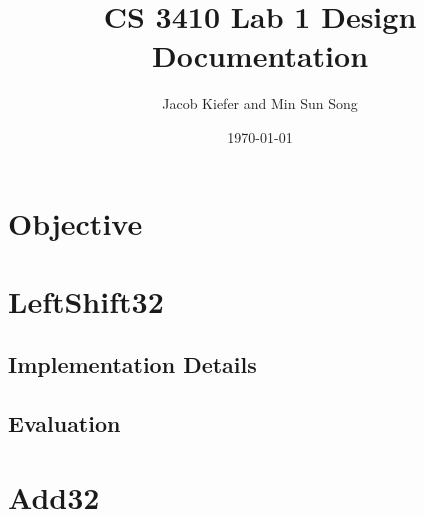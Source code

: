 \documentclass{article}
\title{CS 3410 Lab 1 Design Documentation} %
\author{Jacob Kiefer and Min Sun Song} %
\date{\today} %
\begin{document}
\maketitle %



\section{Objective}


 

\section{LeftShift32}

\subsection{Implementation Details}

\subsection{Evaluation}


\section{Add32}
\end{document}
